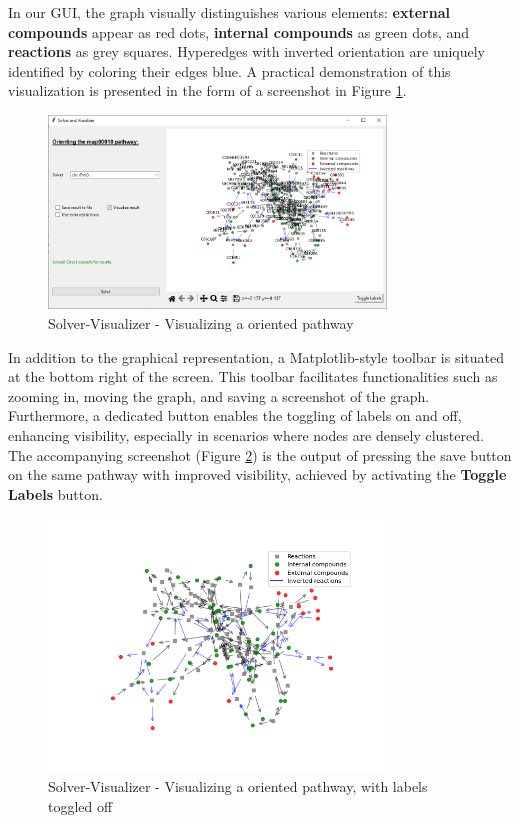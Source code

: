 In our GUI, the graph visually distinguishes various elements: \textbf{external compounds} appear as red dots, \textbf{internal compounds} as green dots, and \textbf{reactions} as grey squares. Hyperedges with inverted orientation are uniquely identified by coloring their edges blue. A practical demonstration of this visualization is presented in the form of a screenshot in Figure \ref{fig:vis_labels}.

\begin{figure} [H]
    \centering
    \includegraphics[width=0.8\textwidth]{Design of the User Interface/vis_labels.png}
    \caption{Solver-Visualizer - Visualizing a oriented pathway}
    \label{fig:vis_labels}
\end{figure}

In addition to the graphical representation, a Matplotlib-style toolbar is situated at the bottom right of the screen. This toolbar facilitates functionalities such as zooming in, moving the graph, and saving a screenshot of the graph. Furthermore, a dedicated button enables the toggling of labels on and off, enhancing visibility, especially in scenarios where nodes are densely clustered. The accompanying screenshot (Figure \ref{fig:vis_no_labels}) is the output of pressing the save button on the same pathway with improved visibility, achieved by activating the \textbf{Toggle Labels} button.

\begin{figure}[H]
    \centering
    \includegraphics[width=0.8\textwidth]{Design of the User Interface/vis_no_labels.png}
    \caption{Solver-Visualizer - Visualizing a oriented pathway, with labels toggled off}
    \label{fig:vis_no_labels}
\end{figure}

